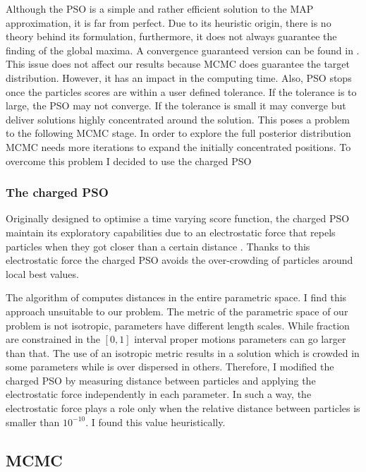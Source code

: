 Although the PSO is a simple and rather efficient solution to the MAP approximation, it is far from perfect. Due to its heuristic origin, there is no theory behind its formulation, furthermore, it does not always guarantee the finding of the global maxima. A convergence guaranteed version can be found in \citet{Patel2013}. This issue does not affect our results because MCMC does guarantee the target distribution. However, it has an impact in the computing time. Also, PSO stops once the particles scores are within a user defined tolerance. If the tolerance is to large, the PSO may not converge. If the tolerance is small it may converge but deliver solutions highly concentrated around the solution. This poses a problem to the following MCMC stage. In order to explore the full posterior distribution MCMC needs more iterations to expand the initially concentrated positions. To overcome this problem I decided to use the charged PSO \citep{Blackwell2002}


\subsubsection{The charged PSO}
Originally designed to optimise a time varying score function, the charged PSO maintain its exploratory capabilities due to an electrostatic force that repels particles when they got closer than a certain distance \citep{Blackwell2002}. Thanks to this electrostatic force the charged PSO avoids the over-crowding of particles around local best values.

The algorithm of \citet{Blackwell2002} computes distances in the entire parametric space. I find this approach unsuitable to our problem. 
The metric of the parametric space of our problem is not isotropic, parameters have different length scales. While fraction are constrained in the $[0,1]$ interval proper motions parameters can go larger than that. The use of an isotropic metric results in a solution which is crowded in some parameters while is over dispersed in others. Therefore, I modified the charged PSO by measuring distance between particles and applying the electrostatic force independently in each parameter. In such a way, the electrostatic force plays a role only when the relative distance between particles is smaller than $10^{-10}$. I found this value heuristically.


 
\subsection{MCMC}
